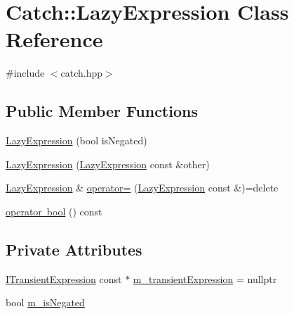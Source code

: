 \hypertarget{class_catch_1_1_lazy_expression}{}\section{Catch\+::Lazy\+Expression Class Reference}
\label{class_catch_1_1_lazy_expression}


{\ttfamily \#include $<$catch.\+hpp$>$}

\subsection*{Public Member Functions}
\begin{DoxyCompactItemize}
\item 
\mbox{\hyperlink{class_catch_1_1_lazy_expression_a47186c2487bd4bf871e870ba8048553a}{Lazy\+Expression}} (bool is\+Negated)
\item 
\mbox{\hyperlink{class_catch_1_1_lazy_expression_ab82d5e94df0e159b018fbde0170e46f8}{Lazy\+Expression}} (\mbox{\hyperlink{class_catch_1_1_lazy_expression}{Lazy\+Expression}} const \&other)
\item 
\mbox{\hyperlink{class_catch_1_1_lazy_expression}{Lazy\+Expression}} \& \mbox{\hyperlink{class_catch_1_1_lazy_expression_ae4ae00d4f36f084c369f2da36565a822}{operator=}} (\mbox{\hyperlink{class_catch_1_1_lazy_expression}{Lazy\+Expression}} const \&)=delete
\item 
\mbox{\hyperlink{class_catch_1_1_lazy_expression_acdb846cb230cecfc6aca7a925b31fbca}{operator bool}} () const
\end{DoxyCompactItemize}
\subsection*{Private Attributes}
\begin{DoxyCompactItemize}
\item 
\mbox{\hyperlink{struct_catch_1_1_i_transient_expression}{I\+Transient\+Expression}} const  $\ast$ \mbox{\hyperlink{class_catch_1_1_lazy_expression_a5a9ce4c2401a262c21b4e107551180bc}{m\+\_\+transient\+Expression}} = nullptr
\item 
bool \mbox{\hyperlink{class_catch_1_1_lazy_expression_a975fdfe2bb139512024bb479d478425e}{m\+\_\+is\+Negated}}
\end{DoxyCompactItemize}
